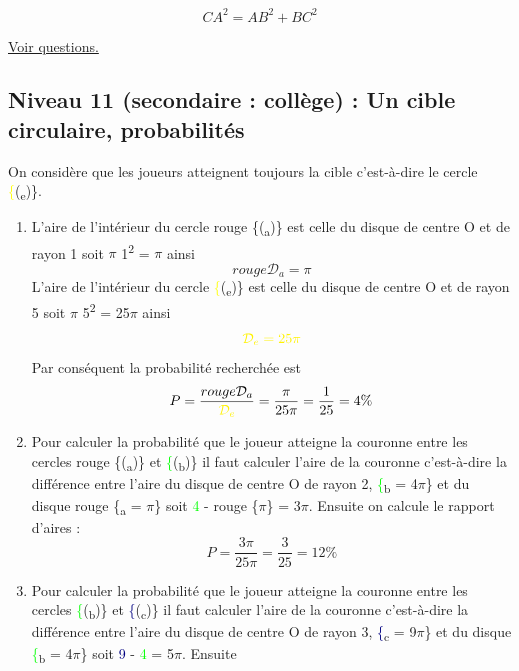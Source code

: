 \documentclass[11pt]{article}
\begin{document}
\[CA^2 = AB^2 + BC^2\]

\hyperref[orgbbb0207]{Voir questions.}


\newpage


\subsection{Niveau 11 (secondaire : collège) : Un cible circulaire, probabilités}
\label{sec:orgc27b756}

\label{org474bdb9}



On considère que les joueurs atteignent toujours la cible c'est-à-dire
le cercle \textcolor{yellow}\{(\textsubscript{e})\}.


\begin{enumerate}
\item L'aire de l'intérieur du cercle rouge \{(\textsubscript{a})\}
est celle du disque de centre O et de rayon 1 soit \(\pi\)\texttimes{} 1\textsuperscript{2} =
\(\pi\) ainsi \[rouge {\mathcal{D}_a = \pi}\]
L'aire de l'intérieur du cercle
\textcolor{yellow}\{(\textsubscript{e})\} est celle du disque de centre
O et de rayon 5 soit \(\pi\)\texttimes{} 5\textsuperscript{2} = 25\(\pi\) ainsi
\[\textcolor{yellow}{\mathcal{D}_e = 25\pi}\]
Par conséquent la probabilité recherchée est  \[P = \frac{
   rouge {\mathcal{D}_a}}{\textcolor{yellow}{\mathcal{D}_e}}
   = \frac{\pi}{25\pi} = \frac{1}{25} = 4\%\]
\item Pour calculer la probabilité que le joueur atteigne la couronne
entre les cercles rouge \{(\textsubscript{a})\} et
\textcolor{lime}\{(\textsubscript{b})\} il faut calculer l'aire de la
couronne c'est-à-dire la différence entre l'aire du disque de
centre O de rayon 2, \textcolor{lime}\{\textsubscript{b} = 4\(\pi\)\} et du
disque rouge \{\textsubscript{a} = \(\pi\)\} soit
\textcolor{lime}{4\pi} - rouge \{\(\pi\)\} = 3\(\pi\). Ensuite on
calcule le rapport d'aires : \[P = \frac{3\pi}{25\pi} =
   \frac{3}{25} = 12\%\]
\item Pour calculer la probabilité que le joueur atteigne la couronne
entre les cercles \textcolor{lime}\{(\textsubscript{b})\} et
\textcolor{navy}\{(\textsubscript{c})\} il faut calculer l'aire de la
couronne c'est-à-dire la différence entre l'aire du disque de
centre O de rayon 3, \textcolor{navy}\{\textsubscript{c} = 9\(\pi\)\} et du
disque \textcolor{lime}\{\textsubscript{b} = 4\(\pi\)\} soit
\textcolor{navy}{9\pi} - \textcolor{lime}{4\pi} = 5\(\pi\). Ensuite

\end{enumerate}
\end{document}
